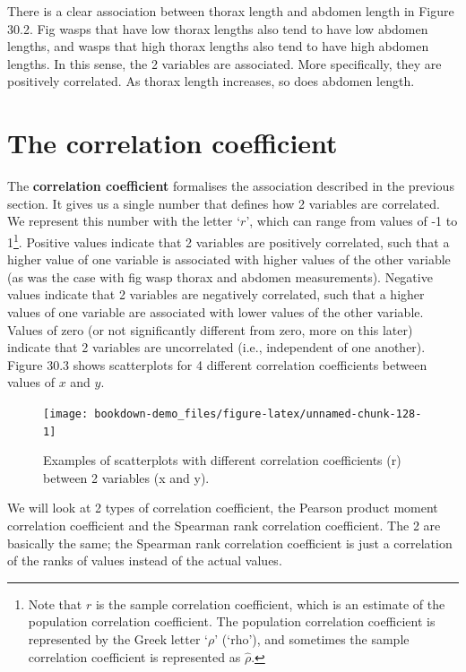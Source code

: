 \documentclass[
  openany]{scrbook}
\begin{document}
There is a clear association between thorax length and abdomen length in Figure 30.2.
Fig wasps that have low thorax lengths also tend to have low abdomen lengths, and wasps that high thorax lengths also tend to have high abdomen lengths.
In this sense, the 2 variables are associated.
More specifically, they are positively correlated.
As thorax length increases, so does abdomen length.

\hypertarget{the-correlation-coefficient}{%
\section{The correlation coefficient}\label{the-correlation-coefficient}}

The \textbf{correlation coefficient} formalises the association described in the previous section.
It gives us a single number that defines how 2 variables are correlated.
We represent this number with the letter `\(r\)', which can range from values of -1 to 1\footnote{Note that \(r\) is the sample correlation coefficient, which is an estimate of the population correlation coefficient. The population correlation coefficient is represented by the Greek letter `\(\rho\)' (`rho'), and sometimes the sample correlation coefficient is represented as \(\hat{\rho}\).}.
Positive values indicate that 2 variables are positively correlated, such that a higher value of one variable is associated with higher values of the other variable (as was the case with fig wasp thorax and abdomen measurements).
Negative values indicate that 2 variables are negatively correlated, such that a higher values of one variable are associated with lower values of the other variable.
Values of zero (or not significantly different from zero, more on this later) indicate that 2 variables are uncorrelated (i.e., independent of one another).
Figure 30.3 shows scatterplots for 4 different correlation coefficients between values of \(x\) and \(y\).

\begin{figure}
\texttt{[image: bookdown-demo\_files/figure-latex/unnamed-chunk-128-1]} \caption{Examples of scatterplots with different correlation coefficients (r) between 2 variables (x and y).}\label{fig:unnamed-chunk-128}
\end{figure}

We will look at 2 types of correlation coefficient, the Pearson product moment correlation coefficient and the Spearman rank correlation coefficient.
The 2 are basically the same; the Spearman rank correlation coefficient is just a correlation of the ranks of values instead of the actual values.
\end{document}
